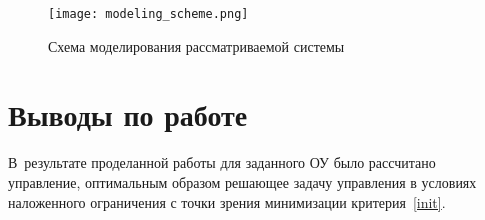 \begin{figure}[h!]
    \centering
    \texttt{[image: modeling\_scheme.png]}
    \vspace{0.5cm}
    \caption{Схема моделирования рассматриваемой системы}
    \label{img_modeling_scheme}
\end{figure}


\section{Выводы по работе}
В~результате проделанной работы для заданного ОУ было рассчитано управление, оптимальным образом решающее задачу управления в условиях наложенного ограничения с точки зрения минимизации критерия~\eqref{init}. 